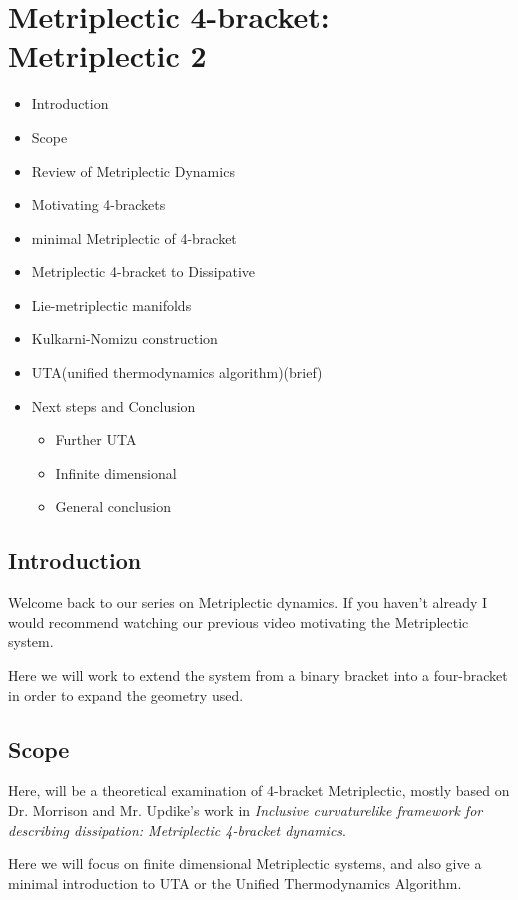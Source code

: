 \section{Metriplectic 4-bracket: Metriplectic 2}

\begin{itemize}
  \item Introduction
  \item Scope
  \item Review of Metriplectic Dynamics
  \item Motivating 4-brackets
  \item minimal Metriplectic of 4-bracket
  \item Metriplectic 4-bracket to Dissipative
  \item Lie-metriplectic manifolds
  \item Kulkarni-Nomizu construction
  \item UTA(unified thermodynamics algorithm)(brief)
  \item Next steps and Conclusion
        \begin{itemize}
          \item Further UTA
          \item Infinite dimensional
          \item General conclusion
        \end{itemize}
\end{itemize}

\subsection{Introduction}

Welcome back to our series on Metriplectic dynamics. If you haven't already I would recommend watching our previous video motivating the Metriplectic system.

Here we will work to extend the system from a binary bracket into a four-bracket in order to expand the geometry used.
\subsection{Scope}

Here, will be a theoretical examination of 4-bracket Metriplectic, mostly based on Dr. Morrison and Mr. Updike's work in \emph{Inclusive curvaturelike framework for describing dissipation: Metriplectic 4-bracket dynamics}.

Here we will focus on finite dimensional Metriplectic systems, and also give a minimal introduction to UTA or the Unified Thermodynamics Algorithm.


